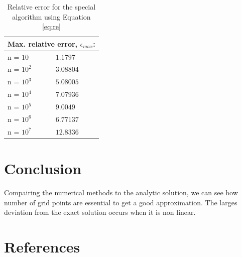 \documentclass{article}
\begin{document}
\begin{table}[]
\centering
\begin{tabular}{ll}
\multicolumn{2}{c}{\textbf{Max. relative error, $\epsilon_{max}$:}} \\ \hline
n = $10$                                  & $1.1797$                                \\
n = $10^2$                                & $3.08804$                               \\
n = $10^3$                                & $5.08005$                               \\
n = $10^4$                                & $7.07936$                               \\
n = $10^5$                                & $9.0049$                                \\
n = $10^6$                                & $6.77137$                               \\
n = $10^7$                                & $12.8336$                              
\end{tabular}
\label{tab:2}
\caption{Relative error for the special algorithm using Equation \ref{eq:re}}
\end{table}


\section{Conclusion}
Compairing the numerical methods to the analytic solution, we can see how number of grid points are essential to get a good approximation. The larges deviation from the exact solution occurs when it is non linear. 

\section{References}
\end{document}
